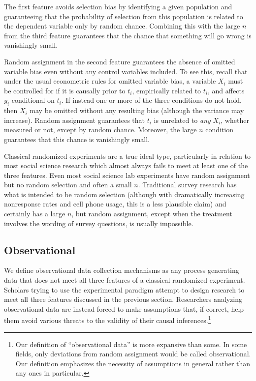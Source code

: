 \documentclass[11pt,titlepage]{article}
\begin{document}
The first feature avoids selection bias by identifying a given
population and guaranteeing that the probability of selection from
this population is related to the dependent variable only by random
chance.  Combining this with the large $n$ from the third feature
guarantees that the chance that something will go wrong is vanishingly
small.

Random assignment in the second feature guarantees the absence of
omitted variable bias even without any control variables included.  To
see this, recall that under the usual econometric rules for omitted
variable bias, a variable $X_i$ must be controlled for if it is
causally prior to $t_i$, empirically related to $t_i$, and affects
$y_i$ conditional on $t_i$.  If instead one or more of the three
conditions do not hold, then $X_i$ may be omitted without any
resulting bias (although the variance may increase).  Random
assignment guarantees that $t_i$ is unrelated to \emph{any} $X_i$,
whether measured or not, except by random chance.  Moreover, the large
$n$ condition guarantees that this chance is vanishingly small.

Classical randomized experiments are a true ideal type, particularly
in relation to most social science research which almost always fails
to meet at least one of the three features.  Even most social science
lab experiments have random assignment but no random selection and
often a small $n$.  Traditional survey research has what is intended
to be random selection (although with dramatically increasing
nonresponse rates and cell phone usage, this is a less plausible
claim) and certainly has a large $n$, but random assignment, except
when the treatment involves the wording of survey questions, is
usually impossible.

\subsection{Observational}

We define observational data collection mechanisms as any process
generating data that does not meet all three features of a classical
randomized experiment.  Scholars trying to use the experimental
paradigm attempt to design research to meet all three features
discussed in the previous section.  Researchers analyzing
observational data are instead forced to make assumptions that, if
correct, help them avoid various threats to the validity of their
causal inferences.\footnote{Our definition of ``observational data''
  is more expansive than some.  In some fields, only deviations from
  random assignment would be called observational.  Our definition
  emphasizes the necessity of assumptions in general rather than any
  ones in particular.}
\end{document}
